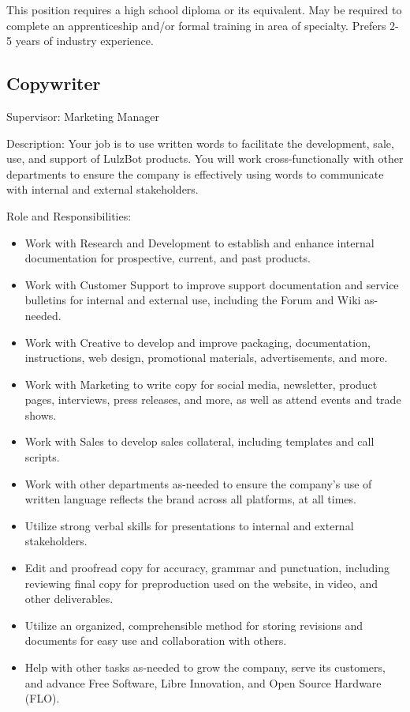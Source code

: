 This position requires a high school diploma or its equivalent. May be required to complete an apprenticeship and/or formal training in area of specialty. Prefers 2-5 years of industry experience.

\subsection{Copywriter}
Supervisor: Marketing Manager

Description: Your job is to use written words to facilitate the development, sale, use, and support of LulzBot products. You will work cross-functionally with other departments to ensure the company is effectively using words to communicate with internal and external stakeholders.

Role and Responsibilities:
\begin{itemize}
 \item Work with Research and Development to establish and enhance internal documentation for prospective, current, and past products.
 \item Work with Customer Support to improve support documentation and service bulletins for internal and external use, including the Forum and Wiki as-needed.
 \item Work with Creative to develop and improve packaging, documentation, instructions, web design, promotional materials, advertisements, and more.
 \item Work with Marketing to write copy for social media, newsletter, product pages, interviews, press releases, and more, as well as attend events and trade shows.
 \item Work with Sales to develop sales collateral, including templates and call scripts.
 \item Work with other departments as-needed to ensure the company's use of written language reflects the brand across all platforms, at all times.
 \item Utilize strong verbal skills for presentations to internal and external stakeholders.
 \item Edit and proofread copy for accuracy, grammar and punctuation, including reviewing final copy for preproduction used on the website, in video, and other deliverables.
 \item Utilize an organized, comprehensible method for storing revisions and documents for easy use and collaboration with others.
 \item Help with other tasks as-needed to grow the company, serve its customers, and advance Free Software, Libre Innovation, and Open Source Hardware (FLO).
\end{itemize}

